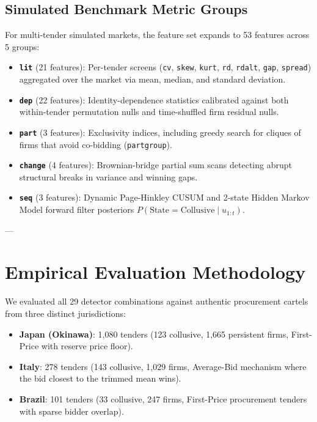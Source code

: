 \documentclass[11pt,a4paper]{article}
\renewcommand{\_}{\textunderscore\allowbreak}
\begin{document}
\subsection{Simulated Benchmark Metric Groups}
For multi-tender simulated markets, the feature set expands to 53 features across 5 groups:
\begin{itemize}[noitemsep]
    \item \textbf{\texttt{lit}} (21 features): Per-tender screens (\texttt{cv}, \texttt{skew}, \texttt{kurt}, \texttt{rd}, \texttt{rdalt}, \texttt{gap}, \texttt{spread}) aggregated over the market via mean, median, and standard deviation.
    \item \textbf{\texttt{dep}} (22 features): Identity-dependence statistics calibrated against both within-tender permutation nulls and time-shuffled firm residual nulls.
    \item \textbf{\texttt{part}} (3 features): Exclusivity indices, including greedy search for cliques of firms that avoid co-bidding (\texttt{part\_group}).
    \item \textbf{\texttt{change}} (4 features): Brownian-bridge partial sum scans detecting abrupt structural breaks in variance and winning gaps.
    \item \textbf{\texttt{seq}} (3 features): Dynamic Page-Hinkley CUSUM and 2-state Hidden Markov Model forward filter posteriors $P(\text{State} = \text{Collusive} \mid u_{1:t})$.
\end{itemize}

---

\section{Empirical Evaluation Methodology}

We evaluated all 29 detector combinations against authentic procurement cartels from three distinct jurisdictions:
\begin{itemize}[noitemsep]
    \item \textbf{Japan (Okinawa)}: 1,080 tenders (123 collusive, 1,665 persistent firms, First-Price with reserve price floor).
    \item \textbf{Italy}: 278 tenders (143 collusive, 1,029 firms, Average-Bid mechanism where the bid closest to the trimmed mean wins).
    \item \textbf{Brazil}: 101 tenders (33 collusive, 247 firms, First-Price procurement tenders with sparse bidder overlap).
\end{itemize}
\end{document}
